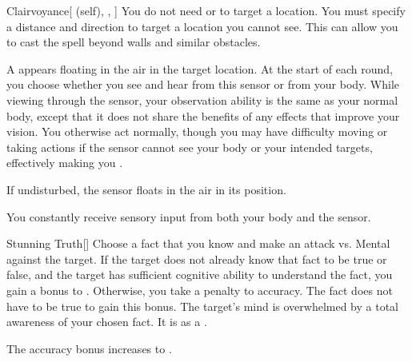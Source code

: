 \lowercase{\hypertarget{spell:Clairvoyance}{}}\label{spell:Clairvoyance}
\begin{attuneability}[Rank 5]{\hypertarget{spell:Clairvoyance}{Clairvoyance}}[ (self), , ]
You do not need  or  to target a location.
You must specify a distance and direction to target a location you cannot see.
This can allow you to cast the spell beyond walls and similar obstacles.

A  appears floating in the air in the target location.
At the start of each round, you choose whether you see and hear from this sensor or from your body.
While viewing through the sensor, your observation ability is the same as your normal body, except that it does not share the benefits of any  effects that improve your vision.
You otherwise act normally, though you may have difficulty moving or taking actions if the sensor cannot see your body or your intended targets, effectively making you \blinded.

If undisturbed, the sensor floats in the air in its position.

\rankline
{} You constantly receive sensory input from both your body and the sensor.


\end{attuneability}
\vspace{0.25em}



\lowercase{\hypertarget{spell:Stunning Truth}{}}\label{spell:Stunning Truth}
\begin{freeability}[Rank 5]{\hypertarget{spell:Stunning Truth}{Stunning Truth}}[]
Choose a fact that you know and make an attack vs. Mental against the target.
If the target does not already know that fact to be true or false,
and the target has sufficient cognitive ability to understand the fact,
you gain a  bonus to .
Otherwise, you take a  penalty to accuracy.
The fact does not have to be true to gain this bonus.
\hit The target's mind is overwhelmed by a total awareness of your chosen fact.
It is  as a .

\rankline
{} The accuracy bonus increases to .

\end{freeability}
\vspace{0.25em}



